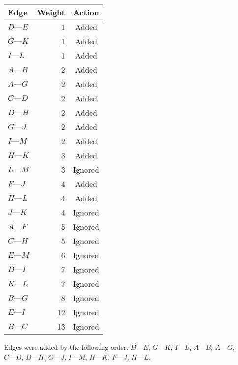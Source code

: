 \documentclass{cal}
\begin{document}
{\begin{center} \begin{tabular}{l | r c}
    \textbf{Edge}    & \textbf{Weight} & \textbf{Action} \\ \hline
    $D \text{---} E$ &               1 & Added \\
    $G \text{---} K$ &               1 & Added \\
    $I \text{---} L$ &               1 & Added \\
    $A \text{---} B$ &               2 & Added \\
    $A \text{---} G$ &               2 & Added \\
    $C \text{---} D$ &               2 & Added \\
    $D \text{---} H$ &               2 & Added \\
    $G \text{---} J$ &               2 & Added \\
    $I \text{---} M$ &               2 & Added \\
    $H \text{---} K$ &               3 & Added \\
    $L \text{---} M$ &               3 & Ignored \\
    $F \text{---} J$ &               4 & Added \\
    $H \text{---} L$ &               4 & Added \\
    $J \text{---} K$ &               4 & Ignored \\
    $A \text{---} F$ &               5 & Ignored \\
    $C \text{---} H$ &               5 & Ignored \\
    $E \text{---} M$ &               6 & Ignored \\
    $D \text{---} I$ &               7 & Ignored \\
    $K \text{---} L$ &               7 & Ignored \\
    $B \text{---} G$ &               8 & Ignored \\
    $E \text{---} I$ &              12 & Ignored \\
    $B \text{---} C$ &              13 & Ignored
\end{tabular} \end{center}

Edges were added by the following order: $D \text{---} E$, $G \text{---} K$, $I \text{---} L$, $A \text{---} B$, $A \text{---} G$, $C \text{---} D$, $D \text{---} H$, $G \text{---} J$, $I \text{---} M$, $H \text{---} K$, $F \text{---} J$, $H \text{---} L$.

}
\end{document}
